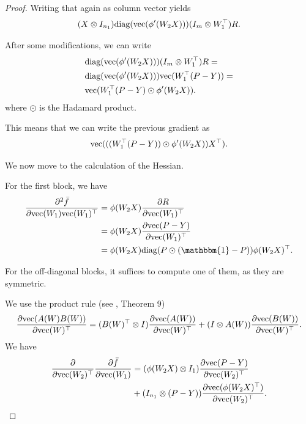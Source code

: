 \documentclass[a4paper,11pt]{article}
\newcommand{\1}{\mathbbm{1}}
\theoremstyle{plain}
\begin{document}
\begin{proof}
Writing that again as column vector yields
\begin{equation*}
    (X \otimes I_{n_1}) \textnormal{diag}(\textnormal{vec}(\phi'(W_2 X))) (I_m \otimes W_1^\top) R.
\end{equation*}

After some modifications, we can write
\begin{align*}
    &\textnormal{diag}(\textnormal{vec}(\phi'(W_2 X))) (I_m \otimes W_1^\top) R = \\ & \textnormal{diag}(\textnormal{vec}(\phi'(W_2 X))) \textnormal{vec}(W_1^\top (P-Y))  = \\ & \textnormal{vec}(W_1^\top (P-Y) \odot \phi'(W_2 X)).
\end{align*}
where $\odot$ is the Hadamard product.

This means that we can write the previous gradient as
\begin{equation*}
    \textnormal{vec}(((W_1^\top (P-Y)) \odot \phi'(W_2 X) ) X^\top).
\end{equation*}

We now move to the calculation of the Hessian.

For the first block, we have
\begin{align*}
    \frac{\partial^2 \bar f}{\partial \textnormal{vec}(W_1) \textnormal{vec}(W_1)^\top } &= \phi(W_2 X) \frac{\partial R}{\partial \textnormal{vec}(W_1)^\top} \\ & = \phi(W_2 X) \frac{\partial \textnormal{vec}(P-Y)}{\partial \textnormal{vec}(W_1)^\top} \\ & =  \phi(W_2 X) \textnormal{diag}(P \odot (\1-P)) \phi(W_2 X)^\top.
\end{align*}

For the off-diagonal blocks, it suffices to compute one of them, as they are symmetric.

We use the product rule (see \cite{magnus1985matrix}, Theorem 9)
\begin{equation*}
    \frac{\partial \textnormal{vec}(A(W) B (W))}{\partial \textnormal{vec}(W)^\top} = (B(W)^\top \otimes I) \frac{\partial \textnormal{vec}(A(W))}{\partial \textnormal{vec}(W)^\top} + (I \otimes A(W)) \frac{\partial \textnormal{vec}(B(W))}{\partial \textnormal{vec}(W)^\top}.
\end{equation*}
We have
\begin{align*}
    \frac{\partial}{\partial \textnormal{vec}(W_2)^\top} \frac{\partial \bar f}{\partial \textnormal{vec}(W_1)} 
& = (\phi(W_2 X) \otimes I_1) \frac{\partial \textnormal{vec} (P-Y) }{\partial \textnormal{vec}(W_2)^\top} \\& + (I_{n_1} \otimes (P-Y) ) \frac{\partial \textnormal{vec} (\phi(W_2 X)^\top) }{\partial \textnormal{vec}(W_2)^\top}. \end{align*}


\end{proof}
\end{document}

